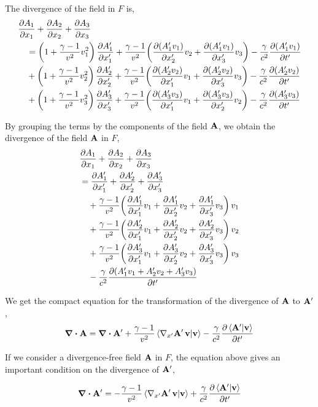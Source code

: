\documentclass[12pt]{article}
\begin{document}
The divergence of the field in $F$ is,
\[
  \begin{aligned}
    &\pdv{A_1}{x_1} + \pdv{A_2}{x_2} + \pdv{A_3}{x_3} \\
    &\quad= \left(1 + \frac{\gamma-1}{v^2}v_1^2\right)\pdv{A'_1}{x'_1}
      + \frac{\gamma-1}{v^2}\!\left(\pdv{(A'_1 v_1)}{x'_2}v_2 + \pdv{(A'_1 v_1)}{x'_3}v_3\right)
      - \frac{\gamma}{c^2}\pdv{(A'_1 v_1)}{t'} \\
    &\quad+ \left(1 + \frac{\gamma-1}{v^2}v_2^2\right)\pdv{A'_2}{x'_2}
      + \frac{\gamma-1}{v^2}\!\left(\pdv{(A'_2 v_2)}{x'_1}v_1 + \pdv{(A'_2 v_2)}{x'_3}v_3\right)
      - \frac{\gamma}{c^2}\pdv{(A'_2 v_2)}{t'} \\
    &\quad+ \left(1 + \frac{\gamma-1}{v^2}v_3^2\right)\pdv{A'_3}{x'_3}
      + \frac{\gamma-1}{v^2}\!\left(\pdv{(A'_3 v_3)}{x'_1}v_1 + \pdv{(A'_3 v_3)}{x'_2}v_2\right)
      - \frac{\gamma}{c^2}\pdv{(A'_3 v_3)}{t'}
  \end{aligned}
\]

By grouping the terms by the components of the field $\vb{A}$, we obtain the divergence of
the field $\vb{A}$ in $F$,
\[
  \begin{aligned}
    &\pdv{A_1}{x_1} + \pdv{A_2}{x_2} + \pdv{A_3}{x_3} \\
    &= \pdv{A'_1}{x'_1} + \pdv{A'_2}{x'_2} + \pdv{A'_3}{x'_3} \\
    &\quad + \frac{\gamma-1}{v^2}\!\left(\pdv{A'_1}{x'_1}v_1 + \pdv{A'_1}{x'_2}v_2 + \pdv{A'_1}{x'_3}v_3\right)v_1 \\
    &\quad + \frac{\gamma-1}{v^2}\!\left(\pdv{A'_2}{x'_1}v_1 + \pdv{A'_2}{x'_2}v_2 + \pdv{A'_2}{x'_3}v_3\right)v_2 \\
    &\quad + \frac{\gamma-1}{v^2}\!\left(\pdv{A'_3}{x'_1}v_1 + \pdv{A'_3}{x'_2}v_2 + \pdv{A'_3}{x'_3}v_3\right)v_3 \\
    &\quad - \frac{\gamma}{c^2}\pdv{(A'_1 v_1 + A'_2 v_2 + A'_3 v_3)}{t'}
  \end{aligned}
\]

We get the compact equation for the transformation of the divergence of $\vb{A}$ to $\vb{A}'$,
\[
  \div \vb{A}
  =
  \div \vb{A}'
  + \frac{\gamma-1}{v^2}
    \ip{\nabla_{x'}\vb{A}'\,\vb v}{\vb v}
  - \frac{\gamma}{c^2}
    \pdv{\ip{\vb{A}'}{\vb{v}}}{t'}
\]

If we consider a divergence-free field $\vb{A}$ in $F$, the equation above gives an important
condition on the divergence of $\vb{A}'$,

\begin{equation}
  \div \vb{A}'
  =
  -\frac{\gamma-1}{v^2}
    \ip{\nabla_{x'}\vb{A}'\,\vb v}{\vb v}
  + \frac{\gamma}{c^2}
    \pdv{\ip{\vb{A}'}{\vb{v}}}{t'}
  \label{eq:divergence_in_Fprime}
\end{equation}
\end{document}

